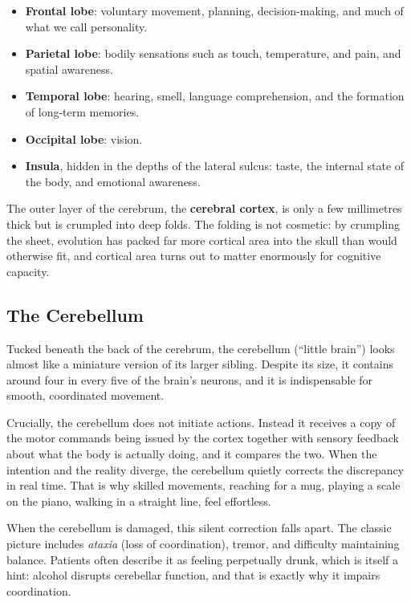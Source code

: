 \documentclass[11pt]{article}
\begin{document}
\begin{itemize}
    \item \textbf{Frontal lobe}: voluntary movement, planning, decision-making, and much of what we call personality.
    \item \textbf{Parietal lobe}: bodily sensations such as touch, temperature, and pain, and spatial awareness.
    \item \textbf{Temporal lobe}: hearing, smell, language comprehension, and the formation of long-term memories.
    \item \textbf{Occipital lobe}: vision.
    \item \textbf{Insula}, hidden in the depths of the lateral sulcus: taste, the internal state of the body, and emotional awareness.
\end{itemize}

The outer layer of the cerebrum, the \textbf{cerebral cortex}, is only a few millimetres thick but is crumpled into deep folds. The folding is not cosmetic: by crumpling the sheet, evolution has packed far more cortical area into the skull than would otherwise fit, and cortical area turns out to matter enormously for cognitive capacity.

\subsection{The Cerebellum}

Tucked beneath the back of the cerebrum, the cerebellum (``little brain'') looks almost like a miniature version of its larger sibling. Despite its size, it contains around four in every five of the brain's neurons, and it is indispensable for smooth, coordinated movement.

Crucially, the cerebellum does not initiate actions. Instead it receives a copy of the motor commands being issued by the cortex together with sensory feedback about what the body is actually doing, and it compares the two. When the intention and the reality diverge, the cerebellum quietly corrects the discrepancy in real time. That is why skilled movements, reaching for a mug, playing a scale on the piano, walking in a straight line, feel effortless.

When the cerebellum is damaged, this silent correction falls apart. The classic picture includes \textit{ataxia} (loss of coordination), tremor, and difficulty maintaining balance. Patients often describe it as feeling perpetually drunk, which is itself a hint: alcohol disrupts cerebellar function, and that is exactly why it impairs coordination.
\end{document}
